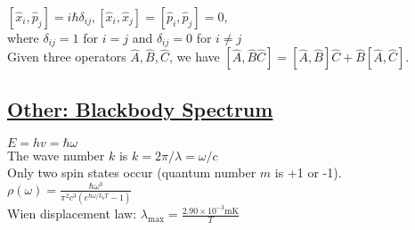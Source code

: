     $[\widehat{x}_i, \widehat{p}_j ] = i \hbar \delta_{ij}, [\widehat{x}_i, \widehat{x}_j] = [\widehat{p}_i, \widehat{p}_j] = 0$, \\ where $\delta_{ij} = 1$ for $i=j$ and $\delta_{ij} = 0$ for $i \neq j$ \\

Given three operators $\widehat{A}, \widehat{B}, \widehat{C}$, we have $[\widehat{A}, \widehat{B}\widehat{C}] = [\widehat{A}, \widehat{B}] \widehat{C} + \widehat{B} [\widehat{A}, \widehat{C}]$.

\subsection{\underline{Other: Blackbody Spectrum}}
$E = hv = \hbar \omega$ \\
The wave number $k$ is $k = 2 \pi / \lambda = \omega / c$ \\
Only two spin states occur (quantum number $m$ is +1 or -1). \\

$\rho(\omega) = \frac{\hbar \omega^3}{\pi^2 c^3 (e^{\hbar \omega / {k_b T}} - 1)}$ \\
Wien displacement law: $\lambda_{\text{max}} = \frac{2.90 \times 10^{-3} \text{mK}}{T}$ \\

